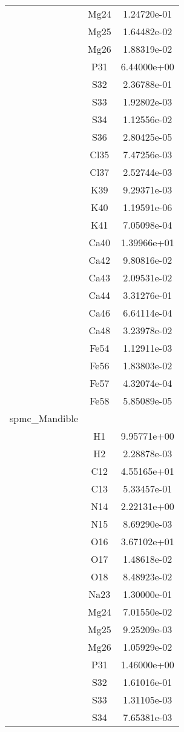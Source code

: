 \begin{centering}
\begin{longtable}{l c c}
& Mg24 & 1.24720e-01 \\ 
& Mg25 & 1.64482e-02 \\ 
& Mg26 & 1.88319e-02 \\ 
& P31 & 6.44000e+00 \\ 
& S32 & 2.36788e-01 \\ 
& S33 & 1.92802e-03 \\ 
& S34 & 1.12556e-02 \\ 
& S36 & 2.80425e-05 \\ 
& Cl35 & 7.47256e-03 \\ 
& Cl37 & 2.52744e-03 \\ 
& K39 & 9.29371e-03 \\ 
& K40 & 1.19591e-06 \\ 
& K41 & 7.05098e-04 \\ 
& Ca40 & 1.39966e+01 \\ 
& Ca42 & 9.80816e-02 \\ 
& Ca43 & 2.09531e-02 \\ 
& Ca44 & 3.31276e-01 \\ 
& Ca46 & 6.64114e-04 \\ 
& Ca48 & 3.23978e-02 \\ 
& Fe54 & 1.12911e-03 \\ 
& Fe56 & 1.83803e-02 \\ 
& Fe57 & 4.32074e-04 \\ 
& Fe58 & 5.85089e-05 \\ 
\hline
spmc\_Mandible & & \\
\hline
& H1 & 9.95771e+00 \\ 
& H2 & 2.28878e-03 \\ 
& C12 & 4.55165e+01 \\ 
& C13 & 5.33457e-01 \\ 
& N14 & 2.22131e+00 \\ 
& N15 & 8.69290e-03 \\ 
& O16 & 3.67102e+01 \\ 
& O17 & 1.48618e-02 \\ 
& O18 & 8.48923e-02 \\ 
& Na23 & 1.30000e-01 \\ 
& Mg24 & 7.01550e-02 \\ 
& Mg25 & 9.25209e-03 \\ 
& Mg26 & 1.05929e-02 \\ 
& P31 & 1.46000e+00 \\ 
& S32 & 1.61016e-01 \\ 
& S33 & 1.31105e-03 \\ 
& S34 & 7.65381e-03 \\ 

\end{longtable}
\end{centering}
